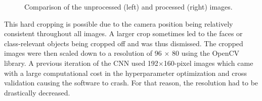 \begin{figure}[H]
    \centering
    \begin{subfigure}{0.48\textwidth}
        \centering
    \end{subfigure}
    \hfill
    \begin{subfigure}{0.48\textwidth}
        \centering
    \end{subfigure}
    \caption{Comparison of the unprocessed (left) and processed (right) images.}
    \label{fig:comp1}
\end{figure}
\noindent
This hard cropping is possible due to the camera position being relatively consistent throughout all images. A larger crop sometimes led to the faces or class-relevant objects being cropped off and was thus dismissed. 
The cropped images were then scaled down to a resolution of 96 $\times$ 80 using the OpenCV \cite{opencv} library. A previous iteration of the CNN used 192$\times$160-pixel images which came with a large computational cost in the hyperparameter optimization and cross validation causing the software to crash. For that reason, the resolution had to be drastically decreased.
